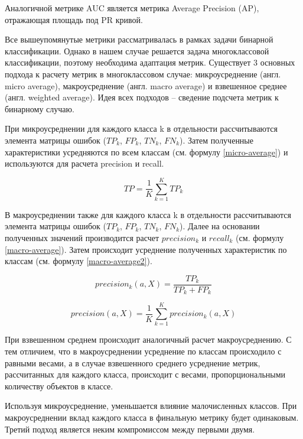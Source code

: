 \documentclass[a4paper,12pt]{extarticle}
\begin{document}
Аналогичной метрике AUC является метрика Average Precision (AP), отражающая площадь под PR кривой.

Все вышеупомянутые метрики рассматривалась в рамках задачи бинарной классификации. Однако в нашем случае решается задача многоклассовой классификации, поэтому необходима адаптация метрик. Существует 3 основных подхода к расчету метрик в многоклассовом случае: микроусреднение (англ. micro average), макроусреднение (англ. macro average) и взвешенное среднее (англ. weighted average). Идея всех подходов – сведение подсчета метрик к бинарному случаю.

При микроусреднении для каждого класса k в отдельности рассчитываются элемента матрицы ошибок ($TP_k$, $FP_k$, $TN_k$, $FN_k$). Затем полученные характеристики усредняются по всем классам (см. формулу \ref{micro-average}) и используются для расчета precision и recall.

\begin{equation}
	\label{micro-average}
	TP = \frac{1}{K}\sum_{k=1}^{K}TP_k
\end{equation}

В макроусреднении также для каждого класса k в отдельности рассчитываются элемента матрицы ошибок ($TP_k$, $FP_k$, $TN_k$, $FN_k$). Далее на основании полученных значений производится расчет $precision_k$ и $recall_k$ (см. формулу \ref{macro-average}). Затем происходит усреднение полученных характеристик по классам (см. формулу \ref{macro-average2}).

\begin{equation}
	\label{macro-average}
	precision_k(a, X) = \frac{TP_k}{TP_k + FP_k}
\end{equation}

\begin{equation}
	\label{macro-average2}
	precision(a, X) = \frac{1}{K}\sum_{k=1}^{K}precision_k(a, X)
\end{equation}

При взвешенном среднем происходит аналогичный расчет макроусреднению. С тем отличием, что в макроусреднении усреднение по классам происходило с равными весами, а в случае взвешенного среднего усреднение метрик, рассчитанных для каждого класса, происходит с весами, пропорциональными количеству объектов в классе.

Используя микроусреднение, уменьшается влияние малочисленных классов. При макроусреднении вклад каждого класса в финальную метрику будет одинаковым. Третий подход является неким компромиссом между первыми двумя.
\end{document}
